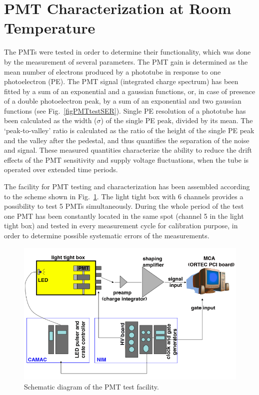 \section{PMT Characterization at Room Temperature}
\label{PMTtest}

The PMTs were tested in order to determine their functionality, which was done by the measurement of several parameters. The PMT gain is determined as the mean number of electrons produced by a phototube in response to one photoelectron (PE). The PMT signal (integrated charge spectrum) has been fitted by a sum of an exponential and  a gaussian functions, or, in case of presence of a double photoelectron peak, by a sum of an exponential and two gaussian functions (see Fig.~\ref{figPMTtestSER}). Single PE resolution of a phototube has been calculated as the width ($\sigma$) of the single PE peak, divided by its mean. The `peak-to-valley' ratio is calculated as the ratio of the height of the single PE peak and the valley after the pedestal, and thus quantifies the separation of the noise and signal. These measured quantities characterize the ability to reduce the drift effects of the PMT sensitivity and supply voltage fluctuations, when the tube is operated over extended time periods. 

The facility for PMT testing and characterization has been assembled according to the scheme shown in Fig.~\ref{figPMTtestScheme}. The light tight box with 6 channels provides a possibility to test 5 PMTs simultaneously. During the whole period of the test one PMT has been constantly located in the same spot (channel 5 in the light tight box) and tested in every measurement cycle for calibration purpose, in order to determine possible systematic errors of the measurements. 

\begin{figure}[!ht]
\centering
\includegraphics[width=0.8\linewidth]{plots/PMTtest/PMTtestSetupFlip_withLabels.png}
\caption[Schematic diagram of the PMT test facility]{Schematic diagram of the PMT test facility.}
\label{figPMTtestScheme}
\end{figure}

